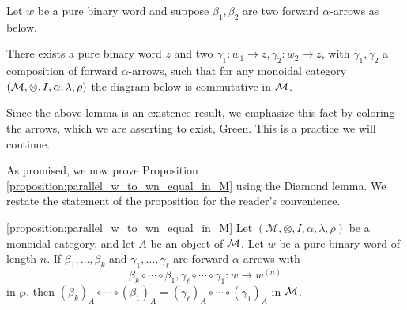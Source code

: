 \begin{lemma}\label{lemma:diamond_lemma}
    Let $w$ be a pure binary word and suppose $\beta_1,\beta_2$ are two 
    forward $\alpha$-arrows as below.
    \begin{center}
    \end{center}
    There exists a pure binary word $z$ and two $\gamma_1: w_1 \to z, \gamma_2: w_2 \to z$,
    with $\gamma_1, \gamma_2$ a composition of forward $\alpha$-arrows,
    such that for any monoidal category 
    $(\mathcal{M}, \otimes, I, \alpha, \lambda, \rho)$ the diagram below is 
    commutative in $\mathcal{M}$.
    \begin{center}
    \end{center} 
\end{lemma}

Since the above lemma is an existence result, 
we emphasize this fact by coloring 
the arrows, which we are asserting to exist, Green. 
This is a practice we will continue.

As promised, we now prove Proposition \ref{proposition:parallel_w_to_wn_equal_in_M} 
using the Diamond lemma. We restate the statement of the proposition for the reader's 
convenience.

\begin{customprop}{\ref{proposition:parallel_w_to_wn_equal_in_M}}
    Let $(\mathcal{M}, \otimes, I, \alpha, \lambda, \rho)$ be a monoidal category, 
    and let $A$ be an object of $\mathcal{M}$. Let $w$ be a pure binary word of length $n$.
    If $\beta_1, \dots , \beta_k$ and $\gamma_1, \dots , \gamma_{\ell}$ are 
    forward $\alpha$-arrows with 
    \[
        \beta_k \circ \cdots \circ \beta_1,
        \gamma_{\ell} \circ \cdots \circ \gamma_1: w \to w^{(n)}
    \]
    in $\wp$, then $(\beta_k)_A  \circ \cdots \circ (\beta_1)_A
    = (\gamma_{\ell})_A \circ \cdots \circ (\gamma_1)_A$ in $\mathcal{M}$.
\end{customprop}

